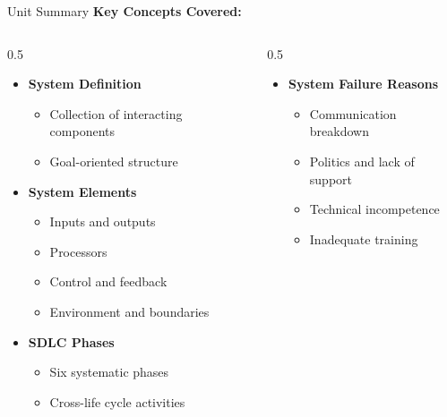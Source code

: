 \documentclass[aspectratio=169]{beamer}
\begin{document}
\begin{frame}{Unit Summary}
    \textbf{Key Concepts Covered:}
    
    \begin{columns}
        \begin{column}{0.5\textwidth}
            \begin{itemize}
                \item[\faCheckCircle] \textbf{System Definition}
                \begin{itemize}
                    \item Collection of interacting components
                    \item Goal-oriented structure
                \end{itemize}
                
                \item[\faCheckCircle] \textbf{System Elements}
                \begin{itemize}
                    \item Inputs and outputs
                    \item Processors
                    \item Control and feedback
                    \item Environment and boundaries
                \end{itemize}
                
                \item[\faCheckCircle] \textbf{SDLC Phases}
                \begin{itemize}
                    \item Six systematic phases
                    \item Cross-life cycle activities
                \end{itemize}
            \end{itemize}
        \end{column}
        \begin{column}{0.5\textwidth}
            \begin{itemize}
                \item[\faCheckCircle] \textbf{System Failure Reasons}
                \begin{itemize}
                    \item Communication breakdown
                    \item Politics and lack of support
                    \item Technical incompetence
                    \item Inadequate training
                \end{itemize}
                

\end{itemize}
\end{column}
\end{columns}
\end{frame}
\end{document}
